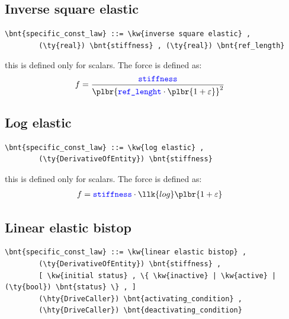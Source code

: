 \subsection{Inverse square elastic}
\begin{Verbatim}[commandchars=\\\{\}]
    \bnt{specific_const_law} ::= \kw{inverse square elastic} ,
        (\ty{real}) \bnt{stiffness} , (\ty{real}) \bnt{ref_length}
\end{Verbatim}
this is defined only for scalars. The force is defined as:
\begin{align}
    f &= \frac{\nt{stiffness}}{\plbr{\nt{ref\_lenght} \cdot \plbr{1 + \varepsilon}}^2}
\end{align}
  
\subsection{Log elastic}
\begin{Verbatim}[commandchars=\\\{\}]
    \bnt{specific_const_law} ::= \kw{log elastic} ,
        (\ty{DerivativeOfEntity}) \bnt{stiffness}
\end{Verbatim}
this is defined only for scalars. The force is defined as:
\begin{align}
    f &= \nt{stiffness} \cdot \llk{log}\plbr{1 + \varepsilon}
\end{align}
  
\subsection{Linear elastic bistop}
\begin{Verbatim}[commandchars=\\\{\}]
    \bnt{specific_const_law} ::= \kw{linear elastic bistop} ,
        (\ty{DerivativeOfEntity}) \bnt{stiffness} ,
        [ \kw{initial status} , \{ \kw{inactive} | \kw{active} | (\ty{bool}) \bnt{status} \} , ]
        (\hty{DriveCaller}) \bnt{activating_condition} ,
        (\hty{DriveCaller}) \bnt{deactivating_condition}
\end{Verbatim}
  
